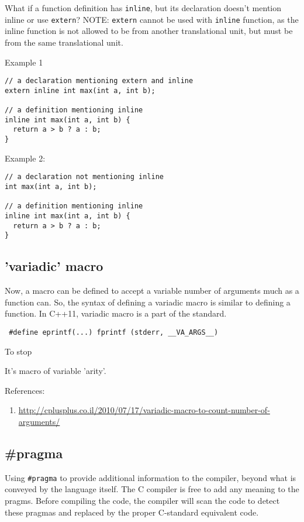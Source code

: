 What if a function definition has \verb!inline!, but its declaration doesn't
mention inline or use \verb!extern!?  NOTE: \verb!extern! cannot be used with
\verb!inline! function, as the inline function is not allowed to be from another
translational unit, but must be from the same translational unit.


Example 1
\begin{lstlisting}
// a declaration mentioning extern and inline
extern inline int max(int a, int b);

// a definition mentioning inline
inline int max(int a, int b) {
  return a > b ? a : b;
}
\end{lstlisting}

Example 2:
\begin{lstlisting}
// a declaration not mentioning inline
int max(int a, int b);

// a definition mentioning inline
inline int max(int a, int b) {
  return a > b ? a : b;
}
\end{lstlisting}


\subsection{'variadic' macro}
\label{sec:macro_variadic}

Now, a macro can be defined to accept a variable number of arguments much as a
function can. So, the syntax of defining a variadic macro is similar to defining
a function. In C++11, variadic macro is a part of the standard.
\begin{verbatim}
 #define eprintf(...) fprintf (stderr, __VA_ARGS__)
\end{verbatim}

To stop

 It's macro of variable 'arity'.
 

 
 References:
 \begin{enumerate}
   \item
   \url{http://cplusplus.co.il/2010/07/17/variadic-macro-to-count-number-of-arguments/}
 \end{enumerate}


\subsection{\#pragma}
\label{sec:pragma}

Using \verb!#pragma! to provide additional information to the compiler, beyond
what is conveyed by the language itself. The C compiler is free to add any
meaning to the pragms. Before compiling the code, the compiler will scan the
code to detect these pragmas and replaced by the proper C-standard equivalent
code.

